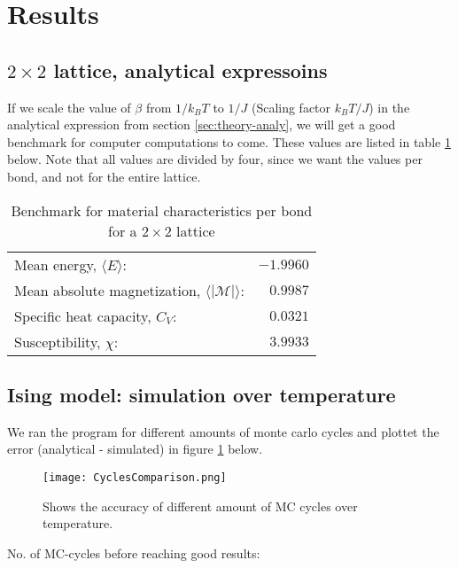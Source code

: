 \documentclass[../main.tex]{subfiles}
\begin{document}
\section{Results}
\subsection{$2 \times 2$ lattice, analytical expressoins}
If we scale the value of $\beta$ from $1/k_BT$ to $1/J$ (Scaling factor $k_B T/J$) in the analytical expression from section \ref{sec:theory-analy}, we will get a good benchmark for computer computations to come. These values are listed in table \ref{tab:2x2spinsEnergiesMags} below. Note that all values are divided by four, since we want the values per bond, and not for the entire lattice.
\begin{table}[!h]
\begin{center}
  \begin{tabular}{l r}
    Mean energy, $\langle E \rangle$: & $-1.9960$  \\
    Mean absolute magnetization, $\langle |\mathcal{M}| \rangle$: & $0.9987$ \\
    Specific heat capacity, $C_V$: & $0.0321$\\
    Susceptibility, $\chi$: & $3.9933$
  \end{tabular}
  \caption{Benchmark for material characteristics per bond for a $2 \times 2$ lattice}
  \label{tab:2x2spinsEnergiesMags}
\end{center}
\end{table}
\FloatBarrier

\subsection{Ising model: simulation over temperature}
We ran the program for different amounts of monte carlo cycles and plottet the error (analytical - simulated) in figure \ref{fig:results-MCplot} below.

\begin{figure}[!h]
\texttt{[image: CyclesComparison.png]}
\caption{Shows the accuracy of different amount of MC cycles over temperature.}
\label{fig:results-MCplot}
\end{figure}
\FloatBarrier
No. of MC-cycles before reaching good results:
\end{document}
